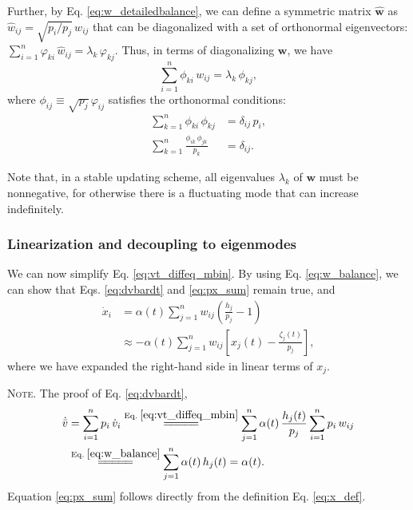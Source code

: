 \documentclass[reprint]{revtex4-1}
\newcommand{\note}[1]{{\color{DarkGreen}\footnotesize \textsc{Note.} #1}}
\begin{document}
Further, by Eq. \eqref{eq:w_detailedbalance},
we can define a symmetric matrix $\hat{\mathbf w}$
as $\hat w_{ij} = \sqrt{p_i/p_j} \, w_{ij}$
that can be diagonalized\cite{vankampen}
with a set of orthonormal eigenvectors:
%
$\sum_{i = 1}^n \varphi_{ki} \, \hat w_{ij} = \lambda_k \, \varphi_{kj}$.
%
Thus,
in terms of diagonalizing $\mathbf w$, we have
\begin{equation}
  \sum_{i = 1}^n \phi_{ki} \, w_{ij} = \lambda_k \, \phi_{kj},
  \label{eq:eig_w}
\end{equation}
where
$\phi_{ij} \equiv \sqrt{p_j} \, \varphi_{ij}$ satisfies
the orthonormal conditions\cite{vankampen}:
%
\begin{align}
\sum_{k = 1}^n \phi_{ki} \, \phi_{kj}
&= \delta_{ij} \, p_i,
\label{eq:eig_orthonormal_cols}
\\
\sum_{k = 1}^n \frac{ \phi_{ik} \, \phi_{jk} }{ p_k }
&= \delta_{ij}.
\label{eq:eig_orthonormal_rows}
\end{align}



Note that, in a stable updating scheme,
all eigenvalues $\lambda_k$ of $\mathbf w$
must be nonnegative,
for otherwise there is a fluctuating mode
that can increase indefinitely.



\subsubsection{Linearization and decoupling to eigenmodes}



We can now simplify Eq. \eqref{eq:vt_diffeq_mbin}.
%
By using Eq. \eqref{eq:w_balance},
we can show that
Eqs. \eqref{eq:dvbardt} and \eqref{eq:px_sum}
remain true, and
%
$$
\begin{aligned}
\dot x_i
&= \alpha(t) \sum_{j=1}^n w_{ij}
\left( \frac{ h_j } { p_j }  - 1 \right)
\\
&\approx
-\alpha(t) \sum_{j = 1}^n
w_{ij} \left[ x_j(t) - \frac{\zeta_j (t)}{p_j} \right],
\end{aligned}
$$
where
we have expanded the right-hand side
in linear terms of $x_j$.

\note{The proof of Eq. \eqref{eq:dvbardt},
$$
\begin{aligned}
  \dot{ \bar v }
  &=
  \sum_{i = 1}^n p_i \, \dot v_i
  \stackrel{\mathrm{Eq.\; \eqref{eq:vt_diffeq_mbin}}}
  {=\joinrel=\joinrel=\joinrel=\joinrel=}
  \sum_{j = 1}^n \alpha(t) \, \frac{ h_j(t) } { p_j }
                 \sum_{ i = 1 }^{n} p_i \, w_{ij}
  \\
  &
  \stackrel{\mathrm{Eq.\; \eqref{eq:w_balance}}}
  {=\joinrel=\joinrel=\joinrel=\joinrel=}
  \sum_{j = 1}^n \alpha(t) \, h_j(t)
  =
  \alpha(t).
\end{aligned}
$$
Equation \eqref{eq:px_sum} follows directly from the definition
Eq. \eqref{eq:x_def}.
}
\end{document}
